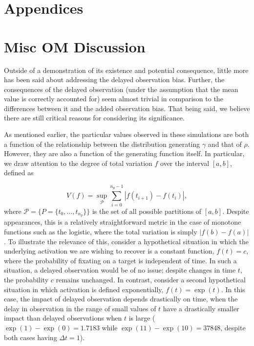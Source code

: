 \documentclass{article}
\begin{document}
\section*{Appendices}


\section{Misc OM Discussion}


Outside of a demonstration of its existence and potential consequence, little more has been said about addressing the delayed observation bias. Further, the consequences of the delayed observation (under the assumption that the mean value is correctly accounted for) seem almost trivial in comparison to the differences between it and the added observation bias. That being said, we believe there are still critical reasons for considering its significance.

As mentioned earlier, the particular values observed in these simulations are both a function of the relationship between the distribution generating $\gamma$ and that of $\rho$. However, they are also a function of the generating function itself. In particular, we draw attention to the degree of total variation $f$ over the interval $[a,b]$, defined as 

\begin{equation}
V(f) = \underset{\mathcal{P}}{\sup} \sum_{i=0}^{n_p-1} \left|f(t_{i+1}) - f(t_i) \right|,
\end{equation}
where $\mathcal{P} = \{P = \{t_0, \dots, t_{n_p}\} \}$ is the set of all possible partitions of $[a,b]$. Despite appearances, this is a relatively straightforward metric in the case of monotone functions such as the logistic, where the total variation is simply $|f(b) - f(a)|$. To illustrate the relevance of this, consider a hypothetical situation in which the underlying activation we are wishing to recover is a constant function, $f(t) = c$, where the probability of fixating on a target is independent of time. In such a situation, a delayed observation would be of no issue; despite changes in time $t$, the probability $c$ remains unchanged. In contrast, consider a second hypothetical situation in which activation is defined exponentially, $f(t) = \exp(t)$. In this case, the impact of delayed observation depends drastically on time, when the delay in observation in the range of small values of $t$ have a drastically smaller impact than delayed observations when $t$ is large ($\exp(1) - \exp(0) = 1.7183$ while $\exp(11) - \exp(10) = 37848$, despite both cases having $\Delta t = 1$).
\end{document}
